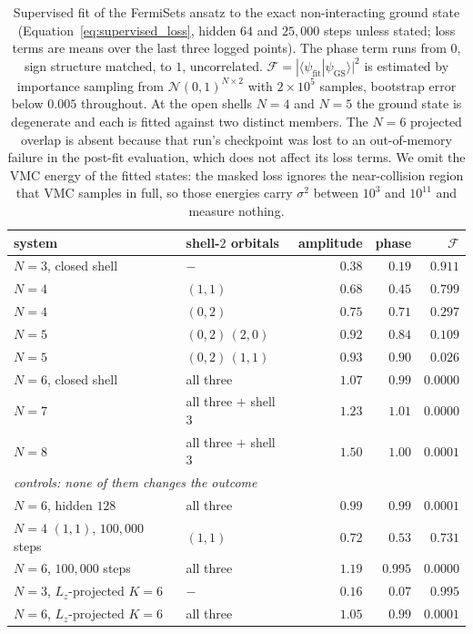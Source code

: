 \documentclass[a4paper,11pt,twoside]{article}
\begin{document}
\begin{table}[H]
    \centering
    \begin{tabular}{l l r r r}
        \hline
        system & shell-$2$ orbitals & amplitude & phase & $\mathcal{F}$ \\
        \hline
        $N=3$, closed shell & $-$              & $0.38$ & $0.19$ & $\mathbf{0.911}$ \\
        $N=4$               & $(1,1)$          & $0.68$ & $0.45$ & $\mathbf{0.799}$ \\
        $N=4$               & $(0,2)$          & $0.75$ & $0.71$ & $0.297$ \\
        $N=5$               & $(0,2)\,(2,0)$   & $0.92$ & $0.84$ & $0.109$ \\
        $N=5$               & $(0,2)\,(1,1)$   & $0.93$ & $0.90$ & $0.026$ \\
        $N=6$, closed shell & all three        & $1.07$ & $0.99$ & $\mathbf{0.0000}$ \\
        $N=7$               & all three $+$ shell $3$ & $1.23$ & $1.01$ & $0.0000$ \\
        $N=8$               & all three $+$ shell $3$ & $1.50$ & $1.00$ & $0.0001$ \\
        \hline
        \multicolumn{5}{l}{\emph{controls: none of them changes the outcome}} \\
        $N=6$, hidden $128$          & all three & $0.99$ & $0.99$ & $0.0001$ \\
        $N=4$ $(1,1)$, $100{,}000$ steps & $(1,1)$ & $0.72$ & $0.53$ & $0.731$ \\
        $N=6$, $100{,}000$ steps     & all three & $1.19$ & $0.995$ & $0.0000$ \\
        $N=3$, $L_z$-projected $K=6$ & $-$       & $0.16$ & $0.07$ & $\mathbf{0.995}$ \\
        $N=6$, $L_z$-projected $K=6$ & all three & $1.05$ & $0.99$ & $ 0.0001$ \\
        \hline
    \end{tabular}
    \caption{Supervised fit of the FermiSets ansatz to the exact non-interacting ground state (Equation~\ref{eq:supervised_loss}, hidden $64$ and $25{,}000$ steps unless stated; loss terms are means over the last three logged points). The phase term runs from $0$, sign structure matched, to $1$, uncorrelated. $\mathcal{F} = |\langle\psi_{\mathrm{fit}}|\psi_{\mathrm{GS}}\rangle|^2$ is estimated by importance sampling from $\mathcal{N}(0,1)^{N\times 2}$ with $2\times10^5$ samples, bootstrap error below $0.005$ throughout. At the open shells $N=4$ and $N=5$ the ground state is degenerate and each is fitted against two distinct members. The $N=6$ projected overlap is absent because that run's checkpoint was lost to an out-of-memory failure in the post-fit evaluation, which does not affect its loss terms. We omit the VMC energy of the fitted states: the masked loss ignores the near-collision region that VMC samples in full, so those energies carry $\sigma^2$ between $10^3$ and $10^{11}$ and measure nothing.}
    \label{tab:supervised}
\end{table}
\end{document}
